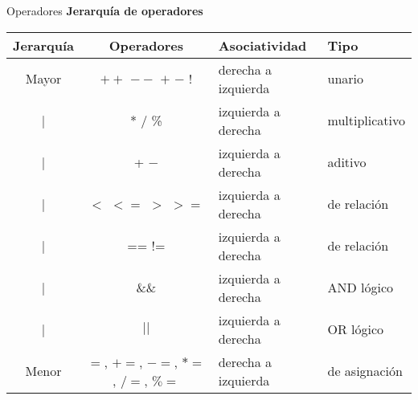 \begin{frame}[t]{Operadores}
\textbf{Jerarquía de operadores}\\ \vspace{5mm}
\footnotesize
\centering
\begin{tabular}{ccll}
	\toprule
	\textbf{Jerarqu\'ia} & \textbf{Operadores} & \textbf{Asociatividad} & \textbf{Tipo}\\ 
	\midrule 
	Mayor & $++$ $--$ $+$ $-$ $!$ & derecha a izquierda & unario\\ \cline{2-4}
	| & * / \% & izquierda a derecha & multiplicativo\\ \cline{2-4}
	| & + $-$ & izquierda a derecha & aditivo\\ \cline{2-4}
	| & $<$ $<=$ $>$ $>=$ & izquierda a derecha & de relaci\'on \\ \cline{2-4}
	| & == != & izquierda a derecha & de relación\\ \cline{2-4}
	| & \&\& & izquierda a derecha & AND lógico\\ \cline{2-4}
	| & $| |$ & izquierda a derecha & OR lógico \\ \cline{2-4}
	Menor & $=$, $+=$, $-=$, $*=$, $/=$, $\%=$ & derecha a izquierda & de asignación \\ 
	\bottomrule
\end{tabular}
\end{frame}


